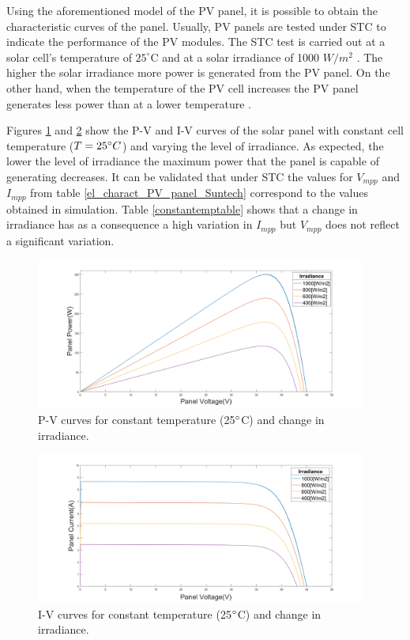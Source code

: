 Using the aforementioned model of the PV panel, it is possible to obtain the characteristic curves of the panel.  Usually, PV panels are tested under STC to indicate the performance of the PV modules. The STC test is carried out at a solar cell's temperature of $25^\circ$C and at a solar irradiance of 1000 $W/ m^2$ \cite{handbook}. The higher the solar irradiance more power is generated from the PV panel. On the other hand, when the temperature of the PV cell increases the PV panel generates less power than at a lower temperature \cite{handbook}. 

Figures \ref{fig:PVcurves_T25} and \ref{fig:IVcurves_T25} show the P-V and I-V curves of the solar panel with constant cell temperature ($T=25\dec C$) and varying the level of irradiance. 
As expected, the lower the level of irradiance the maximum power that the panel is capable of generating decreases. It can be validated that under STC the values for $V_{mpp}$ and $I_{mpp}$ from table \ref{el_charact_PV_panel_Suntech}  correspond to the values obtained in simulation. Table \ref{constantemptable} shows that a change in irradiance has as a consequence a high variation in $I_{mpp}$ but $V_{mpp}$ does not reflect a significant variation.  


\begin{figure}[H]
	\begin{center}
		\includegraphics[width=0.97\textwidth]{../Pictures/constant_temperature}
		\caption{P-V curves for constant temperature (25$\dec$C) and change in irradiance.}
		\label{fig:PVcurves_T25} 
	\end{center}	
\end{figure}

\begin{figure}[H]
	\begin{center}
		\includegraphics[width=0.97\textwidth]{../Pictures/constant_temperature_iv}
		\caption{I-V curves for constant temperature (25$\dec$C) and change in irradiance.}
		\label{fig:IVcurves_T25} 
	\end{center}	
\end{figure}


